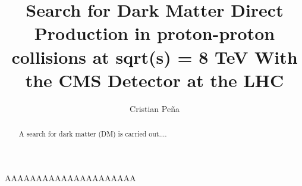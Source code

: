 \documentclass[draftfoot,preprint]{cit_thesis}
\begin{document}
\title{Search for Dark Matter Direct Production in proton-proton collisions at sqrt(s) = 8 TeV With the CMS Detector at the LHC}
\author{Cristian Pe\~na}

\maketitle

\begin{abstract}
A search for dark matter (DM) is carried out....
\end{abstract}


AAAAAAAAAAAAAAAAAAAAA~\cite{vandeHulst,Rubin:1980zd}









\end{document}
